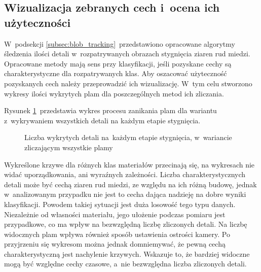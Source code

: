 \subsection{Wizualizacja zebranych cech i~ocena ich użyteczności}
\label{subsec:data_vis}
W~podsekcji \ref{subsec:blob_tracking}~przedstawiono opracowane algorytmy
śledzenia ilości detali w~rozpatrywanych obrazach stygnięcia ziaren rud miedzi.
Opracowane metody mają sens przy klasyfikacji, jeśli pozyskane cechy są
charakterystyczne dla rozpatrywanych klas.
Aby oszacować użyteczność pozyskanych cech należy przeprowadzić ich
wizualizację.
W~tym celu stworzono wykresy ilości wykrytych plam dla poszczególnych metod ich
zliczania.

Rysunek \ref{fig:blob_chart_all}~przedstawia wykres procesu zanikania plam dla
wariantu z~wykrywaniem wszystkich detali na każdym etapie stygnięcia.
\begin{figure}[htb]
    \centering
    
    \caption{Liczba wykrytych detali na~każdym etapie stygnięcia, w~wariancie
        zliczającym wszystkie plamy}
    \label{fig:blob_chart_all}
\end{figure}
Wykreślone krzywe dla różnych klas materiałów przecinają się, na wykresach nie
widać uporządkowania, ani wyraźnych zależności.
Liczba charakterystycznych detali może być cechą ziaren rud miedzi, ze względu
na ich różną budowę, jednak w~analizowanym przypadku nie jest to cecha dająca
nadzieję na dobre wyniki klasyfikacji.
Powodem takiej sytuacji jest duża losowość tego typu danych.
Niezależnie od własności materiału, jego ułożenie podczas pomiaru jest
przypadkowe, co ma wpływ na bezwzględną liczbę zliczonych detali.
Na liczbę widocznych plam wpływa również sposób ustawienia ostrości kamery.
Po przyjrzeniu się wykresom można jednak domniemywać, że pewną cechą
charakterystyczną jest nachylenie krzywych.
Wskazuje to, że bardziej widoczne mogą być względne cechy czasowe, a~nie
bezwzględna liczba zliczonych detali.

